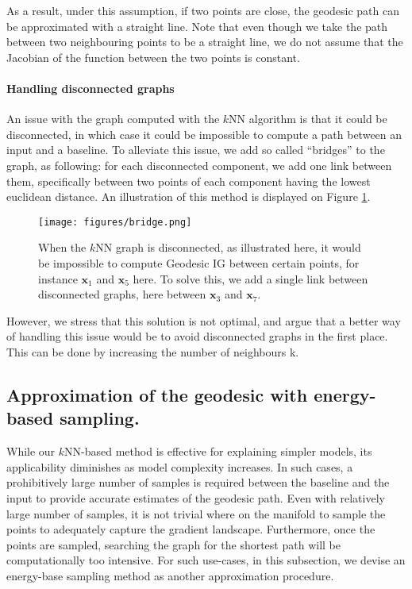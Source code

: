 As a result, under this assumption, if two points are close, the geodesic path can be approximated with a straight line. Note that even though we take the path between two neighbouring points to be a straight line, we do not assume that the Jacobian of the function between the two points is constant. 

\paragraph{Handling disconnected graphs}

An issue with the graph computed with the $k$NN algorithm is that it could be disconnected, in which case it could be impossible to compute a path between an input and a baseline. To alleviate this issue, we add so called ``bridges'' to the graph, as following: for each disconnected component, we add one link between them, specifically between two points of each component having the lowest euclidean distance. An illustration of this method is displayed on Figure \ref{fig:bridge}.

\begin{figure}[ht]
\vskip 0.2in
\begin{center}
\centerline{\texttt{[image: figures/bridge.png]}}
\caption{When the $k$NN graph is disconnected, as illustrated here, it would be impossible to compute Geodesic IG between certain points, for instance $\textbf{x}_1$ and $\textbf{x}_5$ here. To solve this, we add a single link between disconnected graphs, here between $\textbf{x}_3$ and $\textbf{x}_7$.}
\label{fig:bridge}
\end{center}
\vskip -0.2in
\end{figure}

However, we stress that this solution is not optimal, and argue that a better way of handling this issue would be to avoid disconnected graphs in the first place. This can be done by increasing the number of neighbours k.

\subsection{Approximation of the geodesic with energy-based sampling.}
While our $k$NN-based method is effective for explaining simpler models, its applicability diminishes as model complexity increases. In such cases, a prohibitively large number of samples is required between the baseline and the input to provide accurate estimates of the geodesic path. Even with relatively large number of samples, it is not trivial where on the manifold to sample the points to adequately capture the gradient landscape. Furthermore, once the points are sampled, searching the graph for the shortest path will be computationally too intensive. For such use-cases, in this subsection, we devise an energy-base sampling method as another approximation procedure.

